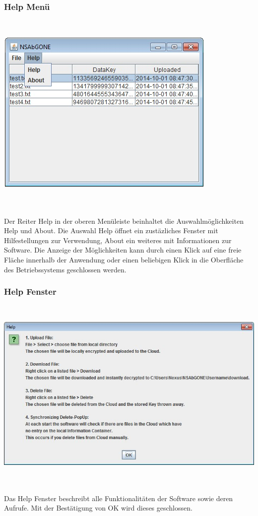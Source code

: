 \documentclass[13pt,a4paper,bibliography=totocnumbered,listof=totocnumbered]{scrartcl}
\begin{document}
\subsubsection{Help Menü}
$\;$\\
\begin{minipage}{\linewidth}
	\centering
	\includegraphics[width=0.4\linewidth]{./img/Help.jpg}
	\label{Help}
\end{minipage}
\\\\Der Reiter Help in der oberen Menüleiste beinhaltet die Auswahlmöglichkeiten Help und About. Die Auswahl Help öffnet ein zustäzliches Fenster mit Hilfestellungen zur Verwendung, About ein weiteres mit Informationen zur Software. Die Anzeige der Möglichkeiten kann durch einen Klick auf eine freie Fläche innerhalb der Anwendung oder einen beliebigen Klick in die Oberfläche des Betriebssystems geschlossen werden.

\subsubsection{Help Fenster}
$\;$\\
\begin{minipage}{\linewidth}
	\centering
	\includegraphics[width=0.4\linewidth]{./img/HelpPopUp.jpg}
	\label{HelpPopUp}
\end{minipage}
\\\\Das Help Fenster beschreibt alle Funktionalitäten der Software sowie deren Aufrufe. Mit der Bestätigung von OK wird dieses  geschlossen.
\end{document}
